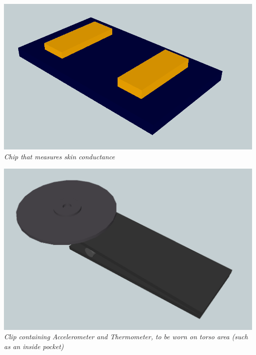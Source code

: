 \documentclass{scrartcl}
\begin{document}
\begin{minipage}{0.4\textwidth}
	\includegraphics[scale=0.2]{img/hardware/WristChip.png} \hfill
	\emph{Chip that measures skin conductance}
\end{minipage}
\hfill
\begin{minipage}{0.4\textwidth}
	\includegraphics[scale=0.2]{img/hardware/TorsoClip.png} \\
	\emph{Clip containing Accelerometer and Thermometer, to be worn on torso area (such as an inside pocket)}
\end{minipage}
\end{document}
